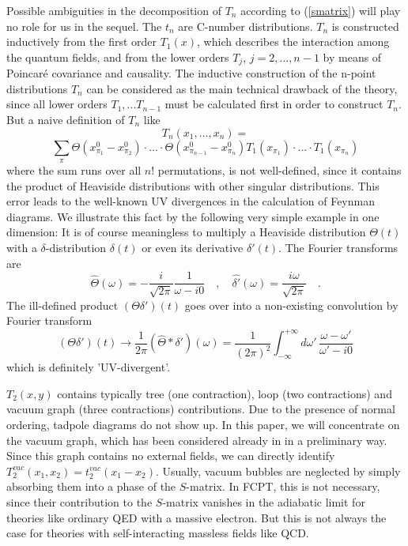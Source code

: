 \documentclass[a4paper,11pt]{article}
\begin{document}
Possible ambiguities in the decomposition of $T_n$ according to
({\ref{smatrix}}) will play no role for us in the sequel.
The $t_{n}$ are C-number distributions. $T_{n}$ is constructed inductively from 
the first order $T_{1}(x)$,
which describes the interaction among the quantum fields,  and from 
the lower orders $T_{j}$, $j=2,\ldots,n-1$ by means of Poincar\'e
covariance and causality.
The inductive construction of the n-point distributions $T_n$
can be considered
as the main technical drawback of the theory, since all lower orders
$T_1,...T_{n-1}$ must be calculated first in order to construct $T_n$.
But a naive definition of $T_n$ like
\begin{displaymath}
T_n(x_1,...,x_n)=
\end{displaymath}
\begin{equation}
\sum_{\pi} \Theta(x_{\pi_1}^0-x_{\pi_2}^0)\cdot ...
\cdot \Theta(x_{\pi_{n-1}}^0-x_{\pi_n}^0) T_1(x_{\pi_1})\cdot ... \cdot
T_1(x_{\pi_n})
\end{equation}
where the sum runs over all $n!$ permutations,
is not well-defined, since it contains the product of Heaviside
distributions with other singular distributions. This error leads to the
well-known UV divergences in the calculation of Feynman diagrams.
We illustrate this fact by the following very simple example in one
dimension:
It is of course meaningless to multiply a Heaviside
distribution $\Theta(t)$ with
a $\delta$-distribution $\delta(t)$ or even its
derivative $\delta'(t)$. The Fourier transforms are
\begin{equation}
\hat{\Theta}(\omega)=-\frac{i}{\sqrt{2 \pi}} \frac{1}{\omega-i0} \quad ,
\quad \hat{\delta'}(\omega)=\frac{i\omega}{\sqrt{2 \pi}} \quad .
\end{equation}
The ill-defined product $(\Theta \delta')(t)$ goes over into a 
non-existing convolution by Fourier transform
\begin{equation}
(\Theta\delta')(t) \rightarrow \frac{1}{2 \pi} (\hat\Theta \ast
\delta')(\omega)=\frac{1}{(2 \pi)^2} \int_{-\infty}^{+\infty}
d\omega' \, \frac{\omega-\omega'}
{\omega'-i0}
\end{equation}
which is definitely 'UV-divergent'.

$T_2(x,y)$ contains typically
tree (one contraction), loop (two contractions) and vacuum graph (three 
contractions)
contributions. Due to the presence of normal ordering, tadpole diagrams do not 
show up. In this paper, we will concentrate on the
vacuum graph, which has been considered already in \cite{nuovoc} in a
preliminary way.
Since this graph contains no external fields, we can directly
identify $T^{vac}_2(x_1,x_2)=t^{vac}_2(x_1-x_2)$. Usually, vacuum bubbles
are neglected by simply absorbing them into a phase of the $S$-matrix. In
FCPT, this is not necessary, since their contribution to the $S$-matrix
vanishes in the adiabatic limit for theories like ordinary QED with a
massive electron. But this is not always the case for theories with
self-interacting massless fields like QCD.
\end{document}

